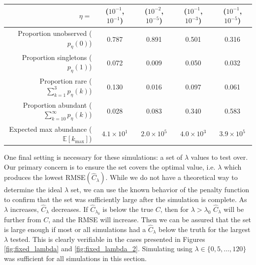 \documentclass[oupdraft]{bio}
\begin{document}
\begin{table}[t]
\centering
\footnotesize
\begin{tabular}{rcccc}
  \hline
 $\eta = $ & ($10^{-1}$, $10^{-1}$) & ($10^{-2}$, $10^{-5}$) & ($10^{-1}$, $10^{-3}$) & ($10^{-1}$, $10^{-5}$) \\
  \hline
  Proportion unobserved ($p_{\eta}(0)$) & 0.787 & 0.891 & 0.501 & 0.316 \\
  Proportion singletons ($p_{\eta}(1)$) & 0.072 & 0.009 & 0.050 & 0.032 \\
  Proportion rare ($\sum_{k=1}^3 p_{\eta}(k)$) & 0.130 & 0.016 & 0.097 & 0.061 \\
  Proportion abundant ($\sum_{k=10}^{\infty} p_{\eta}(k)$) & 0.028 & 0.083 & 0.340 & 0.583 \\
Expected max abundance ($\mathbb{E}\left[k_{\text{max}}\right]$) & $4.1 \times 10^{1}$ & $2.0 \times 10^{5}$ & $4.0 \times 10^{3}$ & $3.9 \times 10^{5}$ \\
   \hline
\end{tabular}
\normalsize
\end{table}
One final setting is necessary for these simulations: a set of $\lambda$ values to test over.  Our primary concern is to ensure the set covers the optimal value, i.e. $\lambda$ which produces the lowest RMSE$(\widehat{C}_{\lambda})$.  While we do not have a theoretical way to determine the ideal $\lambda$ set, we can use the known behavior of the penalty function to confirm that the set was sufficiently large after the simulation is complete.  As $\lambda$ increases, $\widehat{C}_{\lambda}$ decreases.  If $\widehat{C}_{\lambda_0}$ is  below the true $C$, then for $\lambda > \lambda_0$ $\widehat{C}_{\lambda}$ will be further from $C$, and the RMSE will increase.  Then we can be assured that the set is large enough if most or all simulations had a $\widehat{C}_{\lambda}$ below the truth for the largest $\lambda$ tested.  This is clearly verifiable in the cases presented in Figures \ref{fig:fixed_lambda} and \ref{fig:fixed_lambda_2}. Simulating using $\lambda \in \{0, 5, \dots , 120\}$ was sufficient for all simulations in this section.
\end{document}
